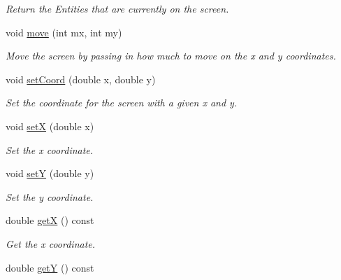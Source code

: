\begin{DoxyCompactItemize}
\begin{DoxyCompactList}\small\item\em Return the Entities that are currently on the screen. \end{DoxyCompactList}\item 
void \hyperlink{classLevel_a9184b25173fbf468a63a633bd3510bd6}{move} (int mx, int my)\hypertarget{classLevel_a9184b25173fbf468a63a633bd3510bd6}{}\label{classLevel_a9184b25173fbf468a63a633bd3510bd6}

\begin{DoxyCompactList}\small\item\em Move the screen by passing in how much to move on the x and y coordinates. \end{DoxyCompactList}\item 
void \hyperlink{classLevel_a3ff79425060f959496d64aa052ef3cf6}{set\+Coord} (double x, double y)\hypertarget{classLevel_a3ff79425060f959496d64aa052ef3cf6}{}\label{classLevel_a3ff79425060f959496d64aa052ef3cf6}

\begin{DoxyCompactList}\small\item\em Set the coordinate for the screen with a given x and y. \end{DoxyCompactList}\item 
void \hyperlink{classLevel_a6212b3c03b3efc82cf69e642cc093959}{setX} (double x)\hypertarget{classLevel_a6212b3c03b3efc82cf69e642cc093959}{}\label{classLevel_a6212b3c03b3efc82cf69e642cc093959}

\begin{DoxyCompactList}\small\item\em Set the x coordinate. \end{DoxyCompactList}\item 
void \hyperlink{classLevel_a7c67443008f7e0f4b5d1630ff2dcf179}{setY} (double y)\hypertarget{classLevel_a7c67443008f7e0f4b5d1630ff2dcf179}{}\label{classLevel_a7c67443008f7e0f4b5d1630ff2dcf179}

\begin{DoxyCompactList}\small\item\em Set the y coordinate. \end{DoxyCompactList}\item 
double \hyperlink{classLevel_a6f5dca509c0e480d8a7b6b1d6b411375}{getX} () const \hypertarget{classLevel_a6f5dca509c0e480d8a7b6b1d6b411375}{}\label{classLevel_a6f5dca509c0e480d8a7b6b1d6b411375}

\begin{DoxyCompactList}\small\item\em Get the x coordinate. \end{DoxyCompactList}\item 
double \hyperlink{classLevel_acb5b4e5e0bf364142fa0facc7badea4a}{getY} () const \hypertarget{classLevel_acb5b4e5e0bf364142fa0facc7badea4a}{}\label{classLevel_acb5b4e5e0bf364142fa0facc7badea4a}


\end{DoxyCompactItemize}
